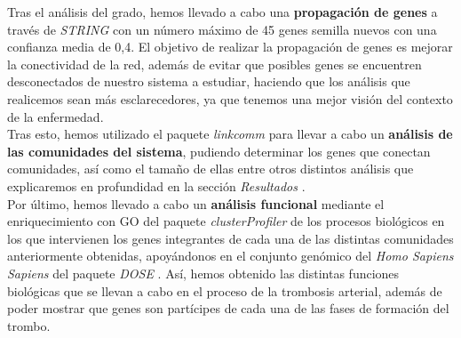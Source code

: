 Tras el análisis del grado, hemos llevado a cabo una \textbf{propagación de genes} a través de \textit{STRING} \cite{STRING} con un número máximo de 45 genes semilla nuevos con una confianza media de 0,4. El objetivo de realizar la propagación de genes es mejorar la conectividad de la red, además de evitar que posibles genes se encuentren desconectados de nuestro sistema a estudiar, haciendo que los análisis que realicemos sean más esclarecedores, ya que tenemos una mejor visión del contexto de la enfermedad. \\

Tras esto, hemos utilizado el paquete \textit{linkcomm} \cite{linkcomm} para llevar a cabo un \textbf{análisis de las comunidades del sistema}, pudiendo determinar los genes que conectan comunidades, así como el tamaño de ellas entre otros distintos análisis que explicaremos en profundidad en la sección \textit{Resultados} .\\

Por último, hemos llevado a cabo un \textbf{análisis funcional} mediante el enriquecimiento con GO del paquete \textit{clusterProfiler} \cite{clusterProfiler} de los procesos biológicos en los que intervienen los genes integrantes de cada una de las distintas comunidades anteriormente obtenidas, apoyándonos en el conjunto genómico del \textit{Homo Sapiens Sapiens} del paquete \textit{DOSE} \cite{DOSE}.  Así, hemos obtenido las distintas funciones biológicas que se llevan a cabo en el proceso de la trombosis arterial, además de poder mostrar que genes son partícipes de cada una de las fases de formación del trombo.
